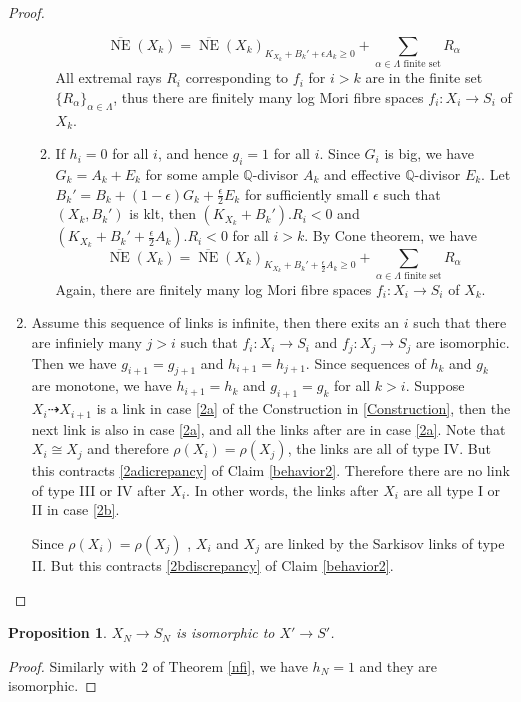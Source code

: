 \documentclass[11pt]{amsart}
\newtheorem{prop}[defn]{Proposition}
\begin{document}
\begin{proof}
\begin{enumerate}
\begin{enumerate}
  \[
    \overline{\operatorname{NE}}(X_{k})=\overline{\operatorname{NE}}(X_{k})_{K_{X_{k}}+B_{k}'+\epsilon A_{k}\geqslant 0} +\sum_{\alpha \in\Lambda\text{ finite set}}R_{\alpha}
  \]
  All extremal rays $R_{i}$ corresponding to $f_{i}$ for $i>k$ are in the finite set $\{R_{\alpha}\}_{\alpha \in \Lambda} $, thus there are finitely many log Mori fibre spaces $f_{i}:X_{i}\to S_{i}$ of $X_{k}$.
\item If $h_{i}=0$ for all $i$, and hence $g_{i}=1$ for all $i$. Since $G_{i}$ is big, we have $G_{k}=A_{k}+E_{k}$ for some ample $\mathbb{Q}$-divisor $A_{k}$ and effective $\mathbb{Q}$-divisor $E_{k}$. Let $B_{k}'=B_{k}+(1-\epsilon)G_{k}+\frac{\epsilon}{2} E_{k}$ for sufficiently small $\epsilon$ such that $(X_{k},B_{k}')$ is klt, then $(K_{X_{k}}+B_{k}').R_{i}<0$ and $(K_{X_{k}}+B_{k}'+\frac{\epsilon}{2} A_{k}).R_{i}<0$ for all $i>k$. By Cone theorem, we have 
\[
    \overline{\operatorname{NE}}(X_{k})=\overline{\operatorname{NE}}(X_{k})_{K_{X_{k}}+B_{k}'+\frac{\epsilon}{2}A_{k}\geqslant 0} +\sum_{\alpha \in\Lambda\text{ finite set}}R_{\alpha}
  \]
  Again, there are finitely many log Mori fibre spaces $f_{i}:X_{i}\to S_{i}$ of $X_{k}$.

\end{enumerate}
\item Assume this sequence of links is infinite, then there exits an  $i$ such that there are infiniely many $j>i$ such that $f_{i}:X_{i}\to S_{i}  $ and $f_{j}:X_{j}\to S_{j}$ are isomorphic. Then we have $g_{i+1}=g_{j+1}$ and $h_{i+1}=h_{j+1}$. Since sequences of $h_{k}$ and $g_{k}$ are monotone, we have $h_{i+1}=h_{k}$ and  $g_{i+1}=g_{k}$ for all $k>i$. Suppose $X_{i}\dashrightarrow X_{i+1}$ is a link in case \ref{2a} of the Construction in \ref{Construction}, then the next link is also in case \ref{2a}, and all the links after are in case \ref{2a}. Note that $X_{i}\cong X_{j}$ and therefore $\rho(X_{i})=\rho(X_{j})$, the links are all of type IV. But this contracts  \ref{2adicrepancy} of Claim \ref{behavior2}. Therefore there are no link of type III or IV after $X_{i}$. In other words, the links after $X_{i}$ are all type I or II in case \ref{2b}.

  Since $\rho(X_{i})= \rho(X_{j})$ , $X_{i}$  and $X_{j}$ are linked by  the Sarkisov links of type II. But this contracts  \ref{2bdiscrepancy} of  Claim \ref{behavior2}.
\end{enumerate}  
\end{proof}
\begin{prop}\label{nfi2}
$X_{N}\to S_{N}$ is isomorphic to $X'\to S'$. 
\end{prop}
\begin{proof}
  Similarly with $2$ of Theorem \ref{nfi}, we have $h_{N}=1$ and they are isomorphic.
\end{proof}
\end{document}
